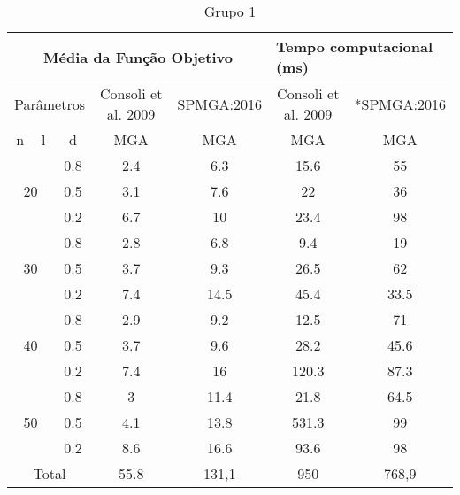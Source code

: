 \documentclass[12pt]{article}
\begin{document}
\begin{table}[]
\centering
\caption{Grupo 1}
\label{my-label}
\begin{tabular}{|c|c|c|c|c|c|c|}
\hline
\multicolumn{5}{|c|}{Média da Função Objetivo}                                          & \multicolumn{2}{l|}{Tempo computacional (ms)} \\ \hline
\multicolumn{3}{|c|}{Parâmetros}                      & Consoli et al. 2009 & SPMGA:2016 & Consoli et al. 2009        & *SPMGA:2016        \\ \hline
n                    & l                  & d         & MGA               & MGA         & MGA                      & MGA                \\ \hline
\multicolumn{2}{|c|}{\multirow{3}{*}{20}} & 0.8       & 2.4               & 6.3         & 15.6                     & 55                 \\ \cline{3-7} 
\multicolumn{2}{|c|}{}                    & 0.5       & 3.1               & 7.6         & 22                       & 36                 \\ \cline{3-7} 
\multicolumn{2}{|c|}{}                    & 0.2       & 6.7               & 10          & 23.4                     & 98                 \\ \hline
\multicolumn{2}{|c|}{\multirow{3}{*}{30}} & 0.8       & 2.8               & 6.8         & 9.4                      & 19                 \\ \cline{3-7} 
\multicolumn{2}{|c|}{}                    & 0.5       & 3.7               & 9.3         & 26.5                     & 62                 \\ \cline{3-7} 
\multicolumn{2}{|c|}{}                    & 0.2       & 7.4               & 14.5        & 45.4                     & 33.5               \\ \hline
\multicolumn{2}{|c|}{\multirow{3}{*}{40}} & 0.8       & 2.9               & 9.2         & 12.5                     & 71                 \\ \cline{3-7} 
\multicolumn{2}{|c|}{}                    & 0.5       & 3.7               & 9.6         & 28.2                     & 45.6               \\ \cline{3-7} 
\multicolumn{2}{|c|}{}                    & 0.2       & 7.4               & 16          & 120.3                    & 87.3               \\ \hline
\multicolumn{2}{|c|}{\multirow{3}{*}{50}} & 0.8       & 3                 & 11.4        & 21.8                     & 64.5               \\ \cline{3-7} 
\multicolumn{2}{|c|}{}                    & 0.5       & 4.1               & 13.8        & 531.3                    & 99                 \\ \cline{3-7} 
\multicolumn{2}{|c|}{}                    & 0.2       & 8.6               & 16.6        & 93.6                     & 98                 \\ \hline
\multicolumn{3}{|c|}{Total}                           & 55.8              & 131,1       & 950                      & 768,9              \\ \hline
\end{tabular}
\end{table}
\end{document}
